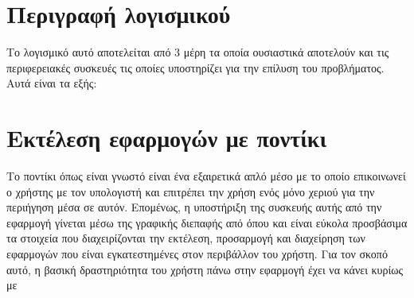 





\section{Περιγραφή λογισμικού}


Το λογισμικό αυτό αποτελείται από 3 μέρη τα οποία ουσιαστικά αποτελούν και
τις περιφερειακές συσκευές τις οποίες υποστηρίζει για την επίλυση του προβλήματος.
Αυτά είναι τα εξής:

\section{Εκτέλεση εφαρμογών με ποντίκι}


Το ποντίκι όπως είναι γνωστό είναι ένα εξαιρετικά απλό μέσο με το οποίο επικοινωνεί
ο χρήστης με τον υπολογιστή και επιτρέπει την χρήση ενός μόνο χεριού για την περιήγηση
μέσα σε αυτόν. Επομένως, η υποστήριξη της συσκευής αυτής από την εφαρμογή γίνεται
μέσω της γραφικής διεπαφής από όπου και είναι εύκολα προσβάσιμα τα στοιχεία που
διαχειρίζονται την εκτέλεση, προσαρμογή και διαχείρηση των εφαρμογών που είναι
εγκατεστημένες στον περιβάλλον του χρήστη. Για τον σκοπό αυτό, η βασική δραστηριότητα
του χρήστη πάνω στην εφαρμογή έχει να κάνει κυρίως με 
